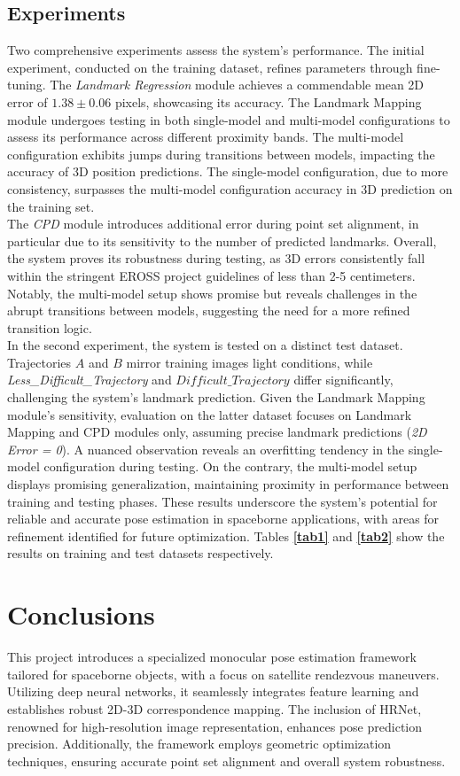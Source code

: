 \subsection{Experiments}
Two comprehensive experiments assess the system's performance. The initial experiment, conducted on the training dataset, refines parameters through fine-tuning. The \textit{Landmark Regression} module achieves a commendable mean 2D error of $1.38 \pm 0.06$ pixels, showcasing its accuracy. The Landmark Mapping module undergoes testing in both single-model and multi-model configurations to assess its performance across different proximity bands. The multi-model configuration exhibits jumps during transitions between models, impacting the accuracy of 3D position predictions. The single-model configuration, due to more consistency, surpasses the multi-model configuration accuracy in 3D prediction on the training set.\\
The \textit{CPD} module introduces additional error during point set alignment, in particular due to its sensitivity to the number of predicted landmarks. Overall, the system proves its robustness during testing, as 3D errors consistently fall within the stringent EROSS project guidelines of less than 2-5 centimeters. Notably, the multi-model setup shows promise but reveals challenges in the abrupt transitions between models, suggesting the need for a more refined transition logic.\\
In the second experiment, the system is tested on a distinct test dataset. Trajectories \textit{$A$} and \textit{$B$} mirror training images light conditions, while \textit{Less\_Difficult\_Trajectory} and \textit{$Difficult\_Trajectory$} differ significantly, challenging the system's landmark prediction. Given the Landmark Mapping module's sensitivity, evaluation on the latter dataset focuses on Landmark Mapping and CPD modules only, assuming precise landmark predictions (\textit{2D Error = 0}). A nuanced observation reveals an overfitting tendency in the single-model configuration during testing. On the contrary, the multi-model setup displays promising generalization, maintaining proximity in performance between training and testing phases. These results underscore the system's potential for reliable and accurate pose estimation in spaceborne applications, with areas for refinement identified for future optimization. Tables \textbf{\ref{tab1}} and \textbf{\ref{tab2}} show the results on training and test datasets respectively.

\section{Conclusions}
This project introduces a specialized monocular pose estimation framework tailored for spaceborne objects, with a focus on satellite rendezvous maneuvers. Utilizing deep neural networks, it seamlessly integrates feature learning and establishes robust 2D-3D correspondence mapping. The inclusion of HRNet, renowned for high-resolution image representation, enhances pose prediction precision. Additionally, the framework employs geometric optimization techniques, ensuring accurate point set alignment and overall system robustness.

